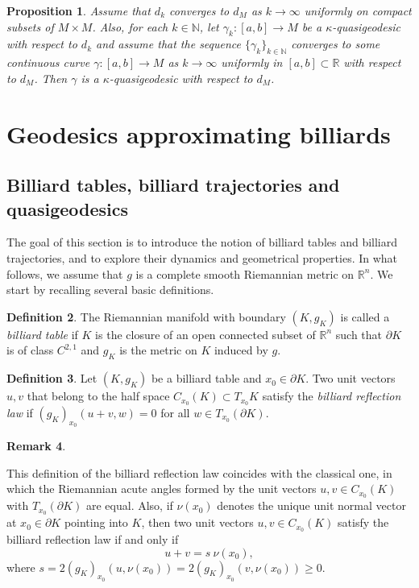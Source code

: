 \documentclass[11pt]{article}
\theoremstyle{definition}
\newtheorem{definition}{Definition}[section]
\newtheorem{remark}[definition]{Remark}
\theoremstyle{remark}
\theoremstyle{plain}
\newtheorem{proposition}[definition]{Proposition}
\newcommand{\R}{\mathbb{R}}
\newcommand{\N}{\mathbb{N}}
\begin{document}
\begin{proposition}\label{prop:quasigeodesic_limit}
  Assume that $d_k$ converges to $d_M$ as $k\to \infty$ uniformly on compact subsets of $M\times M$. Also, for each $k\in \N$, let $\gamma_k:[a,b]\to M$ be a $\kappa$-quasigeodesic with respect to $d_k$ and assume that the sequence $\{\gamma_k\}_{k\in \N}$ converges to some continuous curve $\gamma:[a,b]\to M$ as $k\to\infty$ uniformly in $[a,b]\subset \R$ with respect to $d_M$. Then $\gamma$ is a $\kappa$-quasigeodesic with respect to $d_M$.
\end{proposition}



\section{Geodesics approximating billiards}

\subsection{Billiard tables, billiard trajectories and quasigeodesics}

The goal of this section is to introduce the notion of billiard tables and billiard trajectories, and to explore their dynamics and geometrical properties. In what follows, we assume that $g$ is a complete smooth Riemannian metric on $\R^n$. We start by recalling several basic definitions.

\begin{definition}

The Riemannian manifold with boundary $(K,g_K)$ is called a \textit{billiard table} if $K$ is the closure of an open connected subset of $\R^n$ such that $\partial K$ is of class $C^{2,1}$ and $g_K$ is the metric on $K$ induced by $g$.

\end{definition}

\begin{definition}

Let $(K,g_K)$ be a billiard table and $x_0\in \partial K$. Two unit vectors $u,v$ that belong to the half space $C_{x_0} (K)\subset T_{x_0} K$ satisfy the \textit{billiard reflection law} if $(g_K)_{x_0}(u+v, w) = 0$ for all $w\in T_{x_0}(\partial K)$.

\end{definition}

\begin{remark}\label{rmk:reflection_rule}

This definition of the billiard reflection law coincides with the classical one, in which the Riemannian acute angles formed by the unit vectors $u,v\in C_{x_0}(K)$ with $T_{x_0}(\partial K)$ are equal. Also, if $\nu(x_0)$ denotes the unique unit normal vector at $x_0\in \partial K$ pointing into $K$, then two unit vectors $u,v\in C_{x_0}(K)$ satisfy the billiard reflection law if and only if
$$u+v = s\ \nu(x_0),$$
where $s = 2(g_K)_{x_0}(u,\nu(x_0)) = 2(g_K)_{x_0}(v,\nu(x_0))\ge 0$.

\end{remark}
\end{document}
